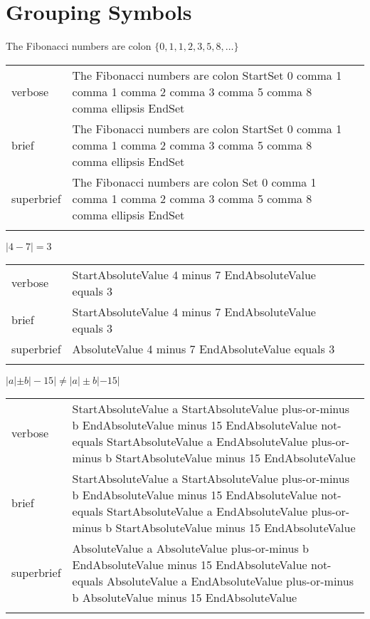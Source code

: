 
\section{Grouping Symbols}
\label{sec:grouping}

\R
\E The Fibonacci numbers are colon $\{0,1,1,2,3,5,8,\ldots\}$
\begin{longtable}[c]{@{}lll@{}}
\toprule\addlinespace
verbose & The Fibonacci numbers are colon StartSet 0 comma 1 comma 1
comma 2 comma 3 comma 5 comma 8 comma ellipsis EndSet &

\\\addlinespace
brief & The Fibonacci numbers are colon StartSet 0 comma 1 comma 1 comma
2 comma 3 comma 5 comma 8 comma ellipsis EndSet &

\\\addlinespace
superbrief & The Fibonacci numbers are colon Set 0 comma 1 comma 1 comma
2 comma 3 comma 5 comma 8 comma ellipsis EndSet &

\\\addlinespace
\bottomrule
\end{longtable}



\R
\E $|4-7|=3$
\begin{longtable}[c]{@{}lll@{}}
\toprule\addlinespace
verbose & StartAbsoluteValue 4 minus 7 EndAbsoluteValue equals 3 &

\\\addlinespace
brief & StartAbsoluteValue 4 minus 7 EndAbsoluteValue equals 3 &

\\\addlinespace
superbrief & AbsoluteValue 4 minus 7 EndAbsoluteValue equals 3 &

\\\addlinespace
\bottomrule
\end{longtable}


\E $\left|a\left|\pm b\right|-15\right|\neq \left|a\right|\pm b\left|-15\right|$
\begin{longtable}[c]{@{}ll@{}}
\toprule\addlinespace
verbose & StartAbsoluteValue a StartAbsoluteValue plus-or-minus b
EndAbsoluteValue minus 15 EndAbsoluteValue not-equals StartAbsoluteValue
a EndAbsoluteValue plus-or-minus b StartAbsoluteValue minus 15
EndAbsoluteValue
\\\addlinespace
brief & StartAbsoluteValue a StartAbsoluteValue plus-or-minus b
EndAbsoluteValue minus 15 EndAbsoluteValue not-equals StartAbsoluteValue
a EndAbsoluteValue plus-or-minus b StartAbsoluteValue minus 15
EndAbsoluteValue
\\\addlinespace
superbrief & AbsoluteValue a AbsoluteValue plus-or-minus b
EndAbsoluteValue minus 15 EndAbsoluteValue not-equals AbsoluteValue a
EndAbsoluteValue plus-or-minus b AbsoluteValue minus 15 EndAbsoluteValue
\\\addlinespace
\bottomrule
\end{longtable}



